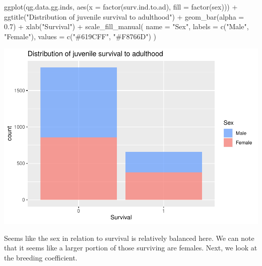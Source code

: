 \documentclass[
]{article}
\newenvironment{Shaded}{\begin{snugshade}}{\end{snugshade}}
\newcommand{\AttributeTok}[1]{\textcolor[rgb]{0.77,0.63,0.00}{#1}}
\newcommand{\FloatTok}[1]{\textcolor[rgb]{0.00,0.00,0.81}{#1}}
\newcommand{\FunctionTok}[1]{\textcolor[rgb]{0.00,0.00,0.00}{#1}}
\newcommand{\NormalTok}[1]{#1}
\newcommand{\SpecialCharTok}[1]{\textcolor[rgb]{0.00,0.00,0.00}{#1}}
\newcommand{\StringTok}[1]{\textcolor[rgb]{0.31,0.60,0.02}{#1}}
\begin{document}
\begin{Shaded}
\begin{Highlighting}[]
\FunctionTok{ggplot}\NormalTok{(qg.data.gg.inds, }\FunctionTok{aes}\NormalTok{(}\AttributeTok{x =} \FunctionTok{factor}\NormalTok{(surv.ind.to.ad), }\AttributeTok{fill =} \FunctionTok{factor}\NormalTok{(sex))) }\SpecialCharTok{+}
  \FunctionTok{ggtitle}\NormalTok{(}\StringTok{"Distribution of juvenile survival to adulthood"}\NormalTok{) }\SpecialCharTok{+}
  \FunctionTok{geom\_bar}\NormalTok{(}\AttributeTok{alpha =} \FloatTok{0.7}\NormalTok{) }\SpecialCharTok{+}
  \FunctionTok{xlab}\NormalTok{(}\StringTok{"Survival"}\NormalTok{) }\SpecialCharTok{+}
  \FunctionTok{scale\_fill\_manual}\NormalTok{(}
    \AttributeTok{name =} \StringTok{"Sex"}\NormalTok{,}
    \AttributeTok{labels =} \FunctionTok{c}\NormalTok{(}\StringTok{"Male"}\NormalTok{, }\StringTok{"Female"}\NormalTok{),}
    \AttributeTok{values =} \FunctionTok{c}\NormalTok{(}\StringTok{"\#619CFF"}\NormalTok{, }\StringTok{"\#F8766D"}\NormalTok{)}
\NormalTok{  )}
\end{Highlighting}
\end{Shaded}

\includegraphics{EDA_files/figure-latex/unnamed-chunk-7-1.pdf}

Seems like the sex in relation to survival is relatively balanced here.
We can note that it seems like a larger portion of those surviving are
females. Next, we look at the breeding coefficient.
\end{document}
